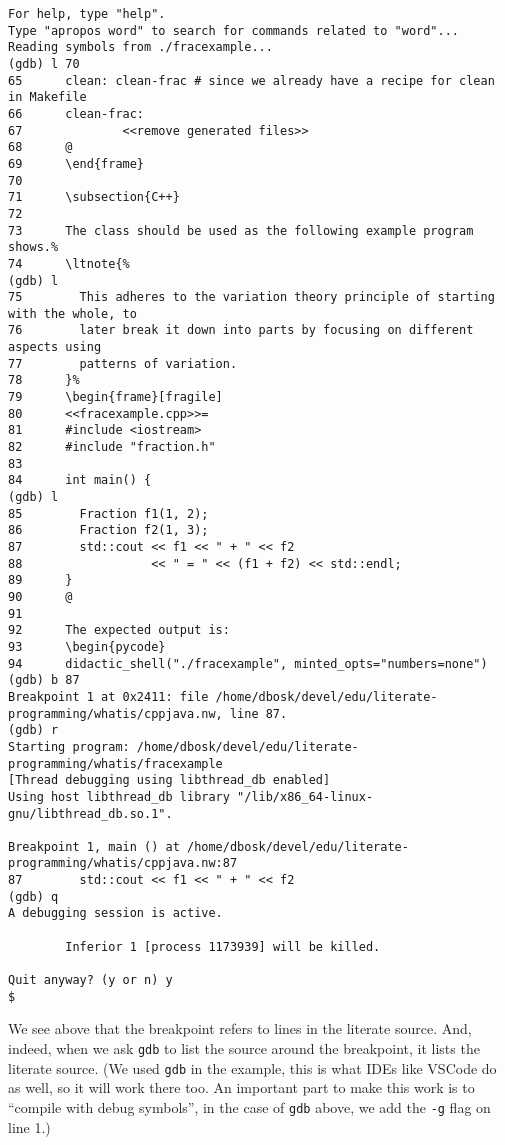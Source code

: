 \begin{verbatim}
For help, type "help".
Type "apropos word" to search for commands related to "word"...
Reading symbols from ./fracexample...
(gdb) l 70
65      clean: clean-frac # since we already have a recipe for clean in Makefile
66      clean-frac:
67              <<remove generated files>>
68      @
69      \end{frame}
70
71      \subsection{C++}
72
73      The class should be used as the following example program shows.%
74      \ltnote{%
(gdb) l
75        This adheres to the variation theory principle of starting with the whole, to 
76        later break it down into parts by focusing on different aspects using 
77        patterns of variation.
78      }%
79      \begin{frame}[fragile]
80      <<fracexample.cpp>>=
81      #include <iostream>
82      #include "fraction.h"
83
84      int main() {
(gdb) l
85        Fraction f1(1, 2);
86        Fraction f2(1, 3);
87        std::cout << f1 << " + " << f2
88                  << " = " << (f1 + f2) << std::endl;
89      }
90      @
91
92      The expected output is:
93      \begin{pycode}
94      didactic_shell("./fracexample", minted_opts="numbers=none")
(gdb) b 87
Breakpoint 1 at 0x2411: file /home/dbosk/devel/edu/literate-programming/whatis/cppjava.nw, line 87.
(gdb) r
Starting program: /home/dbosk/devel/edu/literate-programming/whatis/fracexample 
[Thread debugging using libthread_db enabled]
Using host libthread_db library "/lib/x86_64-linux-gnu/libthread_db.so.1".

Breakpoint 1, main () at /home/dbosk/devel/edu/literate-programming/whatis/cppjava.nw:87
87        std::cout << f1 << " + " << f2
(gdb) q
A debugging session is active.

        Inferior 1 [process 1173939] will be killed.

Quit anyway? (y or n) y
$
\end{verbatim}
We see above that the breakpoint refers to lines in the literate source.
And, indeed, when we ask \texttt{gdb} to list the source around the breakpoint, 
it lists the literate source.
(We used \texttt{gdb} in the example, this is what IDEs like VSCode do as well, 
so it will work there too.
An important part to make this work is to \enquote{compile with debug symbols}, 
in the case of \texttt{gdb} above, we add the \texttt{-g} flag on line 1.)
